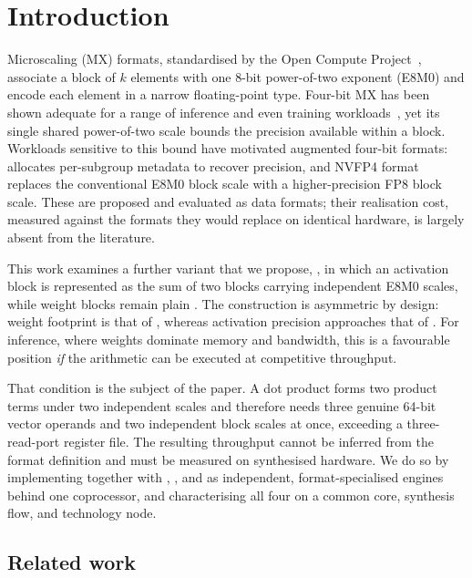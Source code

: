 \section{Introduction}
\label{sec:intro}

Microscaling (MX) formats, standardised by the Open Compute
Project~\cite{ocp2023mx}, associate a block of $k$ elements with one 8-bit
power-of-two exponent (E8M0) and encode each element in a narrow floating-point
type. Four-bit MX has been shown adequate for a range of inference and even
training workloads~\cite{rouhani2023microscaling}, yet its single shared
power-of-two scale bounds the precision available within a block. Workloads
sensitive to this bound have motivated augmented four-bit formats:
\mtwo{}~\cite{m2xfp2026} allocates per-subgroup metadata to recover precision,
and NVFP4 format replaces the conventional E8M0 block scale with a higher-precision FP8 block scale. These are proposed
and evaluated as data formats; their realisation cost, measured against the formats they would replace on identical hardware, is largely absent from the
literature.

This work examines a further variant that we propose, \fpfourres, in which an activation block
is represented as the sum of two \fpfour{} blocks carrying independent E8M0
scales, while weight blocks remain plain \fpfour. The construction is
asymmetric by design: weight footprint is that of \fpfour, whereas activation
precision approaches that of \fpeight. For inference, where weights dominate
memory and bandwidth, this is a favourable position \emph{if} the arithmetic
can be executed at competitive throughput.

That condition is the subject of the paper. A \fpfourres{} dot product forms
two product terms under two independent scales and therefore needs three
genuine 64-bit vector operands and two independent block scales at once,
exceeding a three-read-port register file. The resulting throughput cannot be
inferred from the format definition and must be measured on synthesised
hardware. We do so by implementing \fpfourres{} together with \fpfour,
\fpeight, and \mtwo{} as independent, format-specialised engines behind one
coprocessor, and
characterising all four on a common core, synthesis flow, and technology node.

\subsection{Related work}
\label{sec:intro-related}

